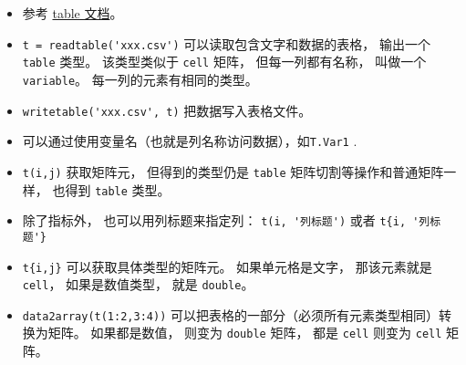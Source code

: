
\begin{issues}
\issueDraft
\end{issues}

\begin{itemize}
\item 参考 \href{https://www.mathworks.com/help/matlab/tables.html}{table 文档}。
\item \verb`t = readtable('xxx.csv')` 可以读取包含文字和数据的表格， 输出一个 \verb`table` 类型。 该类型类似于 \verb`cell` 矩阵， 但每一列都有名称， 叫做一个 \verb`variable`。 每一列的元素有相同的类型。
\item \verb`writetable('xxx.csv', t)` 把数据写入表格文件。

\item 可以通过使用变量名（也就是列名称访问数据），如\verb`T.Var1` .
\item \verb`t(i,j)` 获取矩阵元， 但得到的类型仍是 \verb`table` 矩阵切割等操作和普通矩阵一样， 也得到 \verb`table` 类型。
\item 除了指标外， 也可以用列标题来指定列： \verb`t(i, '列标题')` 或者 \verb`t{i, '列标题'}`
\item \verb`t{i,j}` 可以获取具体类型的矩阵元。 如果单元格是文字， 那该元素就是 \verb`cell`， 如果是数值类型， 就是 \verb`double`。
\item \verb`data2array(t(1:2,3:4))`  可以把表格的一部分（必须所有元素类型相同）转换为矩阵。 如果都是数值， 则变为 \verb`double` 矩阵， 都是 \verb`cell` 则变为 \verb`cell` 矩阵。
\end{itemize}
